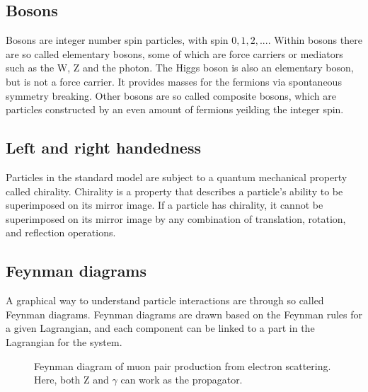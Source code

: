 \subsection*{Bosons}
Bosons are integer number spin particles, with spin $0, 1, 2, ...$. Within bosons there are so called elementary bosons, some of which are force carriers or mediators such as the W, Z and the photon.
The Higgs boson is also an elementary boson, but is not a force carrier. It provides masses for the fermions via spontaneous symmetry breaking\cite{Pich:819632}. Other 
bosons are so called composite bosons, which are particles constructed by an even amount of fermions yeilding the integer spin. 

\subsection*{Left and right handedness}
Particles in the standard model are subject to a quantum mechanical property called chirality. 
Chirality is a property that describes a particle's ability to be superimposed on its mirror image. 
If a particle has chirality, it cannot be superimposed on its mirror image by any combination of translation, rotation, and reflection operations.

\subsection*{Feynman diagrams}
A graphical way to understand particle interactions are through so called Feynman diagrams. Feynman diagrams are drawn based on the Feynman rules for a given Lagrangian\cite{Pich:819632}\cite{feynrules}, and each component 
can be linked to a part in the Lagrangian for the system. 

\begin{figure}[h!]
    \centering
    \caption{Feynman diagram of muon pair production from electron scattering. Here, both Z and $\gamma$ can work as the propagator.}
    
    \label{fig:eemm_scat}
\end{figure}

